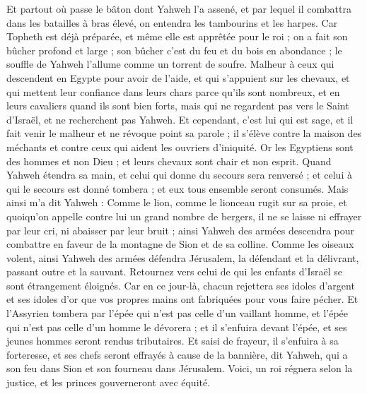 \begin{multicols}{2}
Et partout où passe le bâton dont Yahweh l'a assené, et par lequel il combattra dans les batailles à bras élevé, on entendra les tambourins et les harpes.
Car Topheth est déjà préparée, et même elle est apprêtée pour le roi ; on a fait son bûcher profond et large ; son bûcher c'est du feu et du bois en abondance ; le souffle de Yahweh l'allume comme un torrent de soufre.
\VerseOne{}Malheur à ceux qui descendent en Egypte pour avoir de l'aide, et qui s'appuient sur les chevaux, et qui mettent leur confiance dans leurs chars parce qu'ils sont nombreux, et en leurs cavaliers quand ils sont bien forts, mais qui ne regardent pas vers le Saint d'Israël, et ne recherchent pas Yahweh.
Et cependant, c'est lui qui est sage, et il fait venir le malheur et ne révoque point sa parole ; il s'élève contre la maison des méchants et contre ceux qui aident les ouvriers d'iniquité.
Or les Egyptiens sont des hommes et non Dieu ; et leurs chevaux sont chair et non esprit. Quand Yahweh étendra sa main, et celui qui donne du secours sera renversé ; et celui à qui le secours est donné tombera ; et eux tous ensemble seront consumés.
Mais ainsi m'a dit Yahweh : Comme le lion, comme le lionceau rugit sur sa proie, et quoiqu'on appelle contre lui un grand nombre de bergers, il ne se laisse ni effrayer par leur cri, ni abaisser par leur bruit ; ainsi Yahweh des armées descendra pour combattre en faveur de la montagne de Sion et de sa colline.
Comme les oiseaux volent, ainsi Yahweh des armées défendra Jérusalem, la défendant et la délivrant, passant outre et la sauvant.
Retournez vers celui de qui les enfants d'Israël se sont étrangement éloignés.
Car en ce jour-là, chacun rejettera ses idoles d'argent et ses idoles d'or que vos propres mains ont fabriquées pour vous faire pécher.
Et l'Assyrien tombera par l'épée qui n'est pas celle d'un vaillant homme, et l'épée qui n'est pas celle d'un homme le dévorera ; et il s'enfuira devant l'épée, et ses jeunes hommes seront rendus tributaires.
Et saisi de frayeur, il s'enfuira à sa forteresse, et ses chefs seront effrayés à cause de la bannière, dit Yahweh, qui a son feu dans Sion et son fourneau dans Jérusalem.
\VerseOne{}Voici, un roi régnera selon la justice, et les princes gouverneront avec équité.

\end{multicols}
